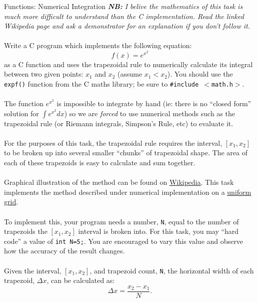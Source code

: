 \documentclass{lab}
\begin{document}
\pagebreak
\begin{task}{Functions: Numerical Integration}{}
\textit{\textbf{NB:} I belive the mathematics of this task is much more difficult to understand than the C implementation. Read the linked Wikipedia page and ask a demonstrator for an explanation if you don't follow it.} \\
~\\
Write a C program which implements the following equation:
\begin{equation*}
f(x) = e^{x^2}
\end{equation*}
as a C function and uses the trapezoidal rule to numerically calculate its integral between two given points: $x_1$ and $x_2$ (assume $x_1 < x_2$). You should use the \texttt{expf()} function from the C maths library; be sure to \texttt{\#include $<$math.h$>$}.
\\~\\
The function $e^{x^2}$ is impossible to integrate by hand (ie: there is no ``closed form'' solution for $\int e^{x^2} dx$) so we are \textit{forced} to use numerical methods such as the trapezoidal rule (or Riemann integrals, Simpson's Rule, etc) to evaluate it.
\\~\\
For the purposes of this task, the trapezoidal rule requires the interval, $[x_1, x_2]$ to be broken up into several smaller ``chunks'' of trapezoidal shape. The area of each of these trapezoids is easy to calculate and sum together.
\\~\\
Graphical illustration of the method can be found on \underline{\href{https://en.wikipedia.org/wiki/Trapezoidal_rule}{Wikipedia}}. This task implements the method described under numerical implementation on a \underline{\href{https://en.wikipedia.org/wiki/Trapezoidal_rule\#Uniform_grid}{uniform grid}}.
\\~\\
To implement this, your program needs a number, \texttt{N}, equal to the number of trapezoids the $[x_1, x_2]$ interval is broken into. For this task, you may ``hard code'' a value of \texttt{int N=5;}. You are encouraged to vary this value and observe how the accuracy of the result changes.
\\~\\
Given the interval, $[x_1, x_2]$, and trapezoid count, \texttt{N}, the horizontal width of each trapezoid, $\Delta x$, can be calculated as:
\begin{equation}
\Delta x = \frac{x_2 - x_1}{N}.
\end{equation}


\end{task}
\end{document}
